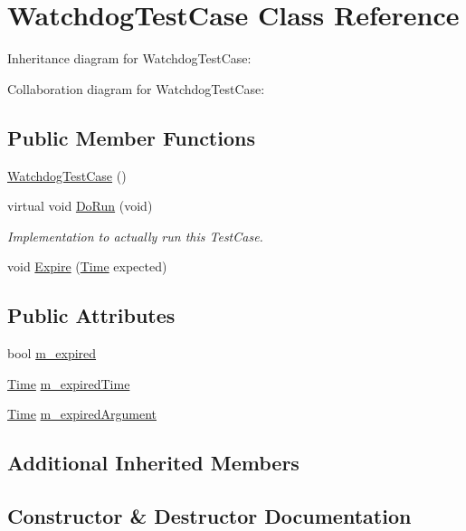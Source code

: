 \hypertarget{classWatchdogTestCase}{}\section{Watchdog\+Test\+Case Class Reference}
\label{classWatchdogTestCase}


Inheritance diagram for Watchdog\+Test\+Case\+:


Collaboration diagram for Watchdog\+Test\+Case\+:
\subsection*{Public Member Functions}
\begin{DoxyCompactItemize}
\item 
\hyperlink{classWatchdogTestCase_ae170b8c0e016c6b098eb66c0907db9ea}{Watchdog\+Test\+Case} ()
\item 
virtual void \hyperlink{classWatchdogTestCase_a81f76aedff6228054266a36c6718b81e}{Do\+Run} (void)
\begin{DoxyCompactList}\small\item\em Implementation to actually run this Test\+Case. \end{DoxyCompactList}\item 
void \hyperlink{classWatchdogTestCase_a8abf7595fc58ed3f826fbeb287d65a23}{Expire} (\hyperlink{classns3_1_1Time}{Time} expected)
\end{DoxyCompactItemize}
\subsection*{Public Attributes}
\begin{DoxyCompactItemize}
\item 
bool \hyperlink{classWatchdogTestCase_a8a5a1d467f0b228d70410e8c6c4d25a8}{m\+\_\+expired}
\item 
\hyperlink{classns3_1_1Time}{Time} \hyperlink{classWatchdogTestCase_aa0f2805ce13495f45652eb98ce374f9c}{m\+\_\+expired\+Time}
\item 
\hyperlink{classns3_1_1Time}{Time} \hyperlink{classWatchdogTestCase_a4547198b5406633de3fc3bf1761359f4}{m\+\_\+expired\+Argument}
\end{DoxyCompactItemize}
\subsection*{Additional Inherited Members}


\subsection{Constructor \& Destructor Documentation}
